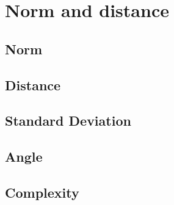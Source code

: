 \section{Norm and distance}
\subsection{Norm} 

\subsection{Distance}

\subsection{Standard Deviation}

\subsection{Angle}

\subsection{Complexity}
